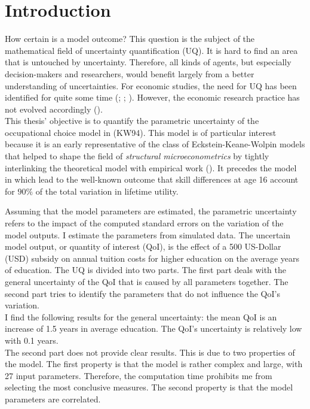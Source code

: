 \section{Introduction}
\thispagestyle{plain} %

How certain is a model outcome? This question is the subject of the mathematical field of uncertainty quantification (UQ). It is hard to find an area that is untouched by uncertainty. Therefore, all kinds of agents, but especially decision-makers and researchers, would benefit largely from a better understanding of uncertainties. For economic studies, the need for UQ  has been identified for quite some time (\cite{Hansen.1996}; \cite{Canova.1994}; \cite{Kydland.1992}). However, the economic research practice has not evolved accordingly (\cite{Harenberg.2019}).\\

\noindent
This thesis' objective is to quantify the parametric uncertainty of the occupational choice model in \cite{Keane.1994} (KW94). This model is of particular interest because it is an early representative of the class of Eckstein-Keane-Wolpin models that helped to shape the field of \textit{structural microeconometrics} by tightly interlinking the theoretical model with empirical work (\cite{Rust.2014}). It precedes the model in \cite{Keane.1997} which lead to the well-known outcome that skill differences at age 16 account for $90\%$ of the total variation in lifetime utility.

Assuming that the model parameters are estimated, the parametric uncertainty refers to the impact of the computed standard errors on the variation of the model outputs. I estimate the parameters from simulated data.
The uncertain model output, or quantity of interest (QoI), is the effect of a 500 US-Dollar (USD) subsidy on annual tuition costs for higher education on the average years of education. The UQ is divided into two parts. The first part deals with the general uncertainty of the QoI that is caused by all parameters together. The second part tries to identify the parameters that do not influence the QoI's variation.\\

\noindent
I find the following results for the general uncertainty: the mean QoI is an increase of 1.5 years in average education. The QoI's uncertainty is relatively low with 0.1 years.\\

\noindent
The second part does not provide clear results. This is due to two properties of the model.
The first property is that the model is rather complex and large, with 27 input parameters. Therefore, the computation time prohibits me from selecting the most conclusive measures.
The second property is that the model parameters are correlated.


